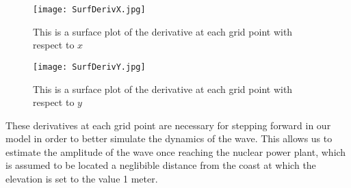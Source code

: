 \documentclass[../main.tex]{subfiles}
\begin{document}
\begin{figure}[H]
\centering
\texttt{[image: SurfDerivX.jpg]}
\caption{This is a surface plot of the derivative at each grid point with respect to $x$}
\end{figure}

\begin{figure}[H]
\centering
\texttt{[image: SurfDerivY.jpg]}
\caption{This is a surface plot of the derivative at each grid point with respect to $y$}
\end{figure}

\noindent These derivatives at each grid point are necessary for stepping forward in our model in order to better simulate the dynamics of the wave. This allows us to estimate the amplitude of the wave once reaching the nuclear power plant, which is assumed to be located a neglibible distance from the coast at which the elevation is set to the value 1 meter.
\end{document}
